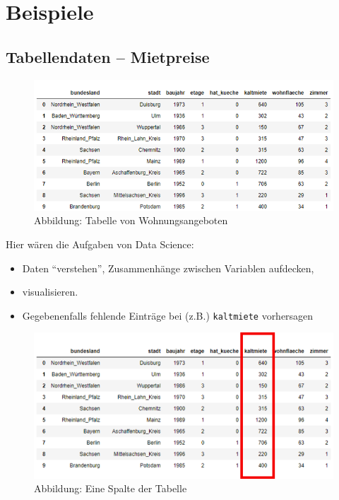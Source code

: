 \documentclass[]{book}
\providecommand{\tightlist}{%
  \setlength{\itemsep}{0pt}\setlength{\parskip}{0pt}}
\theoremstyle{definition}
\theoremstyle{definition}
\theoremstyle{definition}
\theoremstyle{definition}
\theoremstyle{remark}
\begin{document}
\hypertarget{beispiele}{%
\section{Beispiele}\label{beispiele}}

\hypertarget{tabellendaten}{%
\subsection{Tabellendaten -- Mietpreise}\label{tabellendaten}}

\begin{figure}
\centering
\includegraphics{bilder/dataframe.png}
\caption{Abbildung: Tabelle von Wohnungsangeboten}
\end{figure}

Hier wären die Aufgaben von Data Science:

\begin{itemize}
\tightlist
\item
  Daten ``verstehen'', Zusammenhänge zwischen
  Variablen aufdecken,
\item
  visualisieren.
\item
  Gegebenenfalls fehlende Einträge bei (z.B.) \texttt{kaltmiete} vorhersagen
\end{itemize}

\begin{figure}
\centering
\includegraphics{bilder/dataframe_spalte.png}
\caption{Abbildung: Eine Spalte der Tabelle}
\end{figure}
\end{document}

